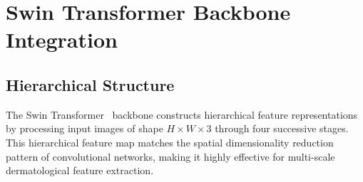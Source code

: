 \documentclass[11pt]{article}
\begin{document}
\section{Swin Transformer Backbone Integration}\label{sec:swin}

\subsection{Hierarchical Structure}\label{subsec:swin_arch}

The Swin Transformer~\cite{liu2021swin} backbone constructs hierarchical feature representations by processing input images of shape $H \times W \times 3$ through four successive stages. This hierarchical feature map matches the spatial dimensionality reduction pattern of convolutional networks, making it highly effective for multi-scale dermatological feature extraction.
\end{document}
